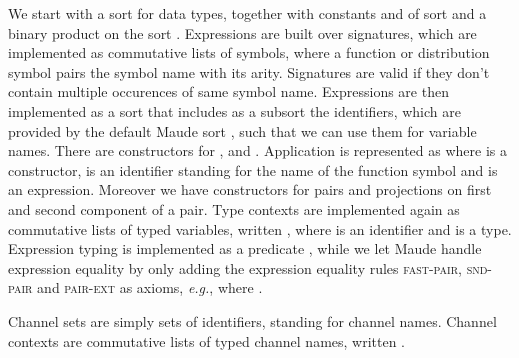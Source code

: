 We start with a sort  for data types, together with 
constants  and  of sort  and a
binary product on the sort . Expressions are built over
signatures, which are implemented as commutative lists of symbols,
where a function or distribution symbol pairs the symbol name with 
its arity. Signatures are valid if they don't contain multiple
occurences of same symbol name. Expressions are then implemented
as a sort  that includes as a subsort the identifiers,
which are provided by the default Maude sort ,
such that we can use them for variable names. There are constructors
for ,  and \code{()}. Application is 
represented as  where  is a constructor, 
is an identifier standing for the name of the function symbol and
 is an expression. Moreover we have constructors for
pairs and projections on first and second component of a pair. 
Type contexts are implemented again as commutative lists of typed
variables, written , where  is an identifier and
 is a type. Expression typing is 
implemented as a predicate 
, while
we let Maude handle expression equality by only adding the expression
equality rules \textsc{fast-pair}, \textsc{snd-pair} and 
\textsc{pair-ext} as axioms, \emph{e.g.},
 where .

Channel sets are simply sets of identifiers, standing for channel
names. Channel contexts are commutative lists of typed channel
names, written .

